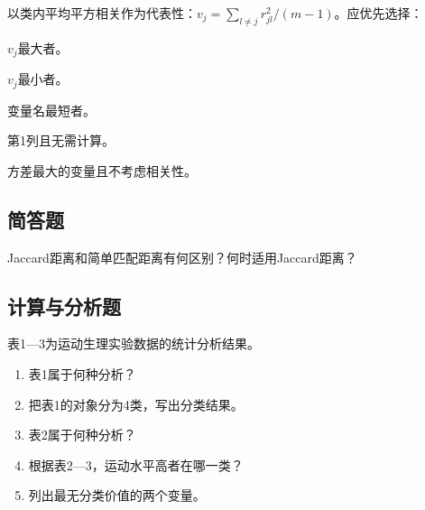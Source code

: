 \par\addvspace{6pt}\noindent\begin{minipage}{\linewidth}


以类内平均平方相关作为代表性：\(v_j=\sum_{l\ne j}r_{jl}^2/(m-1)\)。应优先选择：


\begin{choices}

\item \(v_j\)最大者。

\item \(v_j\)最小者。

\item 变量名最短者。

\item 第1列且无需计算。

\item 方差最大的变量且不考虑相关性。

\end{choices}

\end{minipage}\par\vspace{4pt}

\par\addvspace{6pt}\noindent\begin{minipage}{\linewidth}

\subsection{简答题}


Jaccard距离和简单匹配距离有何区别？何时适用Jaccard距离？



\end{minipage}\par\vspace{4pt}

\subsection{计算与分析题}


表1---3为运动生理实验数据的统计分析结果。

\begin{enumerate}
\def\labelenumi{\arabic{enumi}.}
\tightlist
\item
  表1属于何种分析？
\item
  把表1的对象分为4类，写出分类结果。
\item
  表2属于何种分析？
\item
  根据表2---3，运动水平高者在哪一类？
\item
  列出最无分类价值的两个变量。
\end{enumerate}

